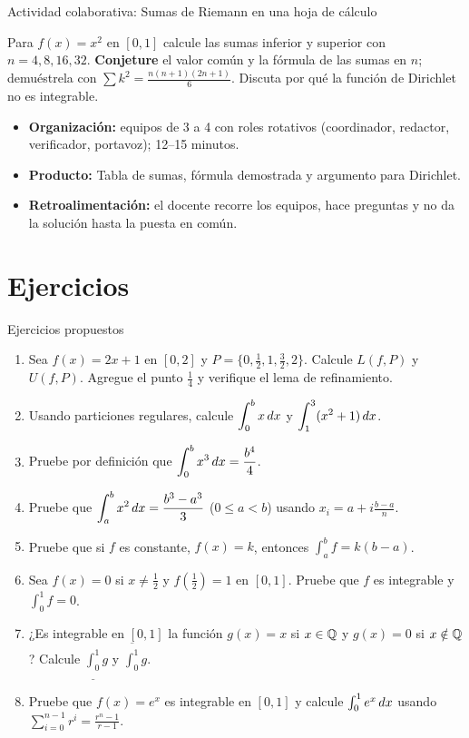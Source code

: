 \documentclass[10pt,aspectratio=169]{beamer}
\begin{document}
\begin{frame}{Actividad colaborativa: Sumas de Riemann en una hoja de cálculo}
  \small
  \begin{activa}
    Para $f(x)=x^2$ en $[0,1]$ calcule las sumas inferior y superior con $n=4,8,16,32$. \textbf{Conjeture} el valor común y la fórmula de las sumas en $n$; demuéstrela con $\sum k^2=\frac{n(n+1)(2n+1)}6$. Discuta por qué la función de Dirichlet no es integrable.
  \end{activa}
  \begin{itemize}
    \item \textbf{Organización:} equipos de 3 a 4 con roles rotativos (coordinador, redactor, verificador, portavoz); 12--15 minutos.
    \item \textbf{Producto:} Tabla de sumas, fórmula demostrada y argumento para Dirichlet.
    \item \textbf{Retroalimentación:} el docente recorre los equipos, hace preguntas y no da la solución hasta la puesta en común.
  \end{itemize}
\end{frame}

\section{Ejercicios}

\begin{frame}{Ejercicios propuestos}
  \begin{ejercicio}
    \begin{enumerate}
      \item Sea $f(x)=2x+1$ en $[0,2]$ y $P=\{0,\tfrac12,1,\tfrac32,2\}$. Calcule $L(f,P)$ y $U(f,P)$.
        Agregue el punto $\tfrac14$ y verifique el lema de refinamiento.
      \item Usando particiones regulares, calcule $\displaystyle\int_0^b x\,dx$ y $\displaystyle\int_1^3(x^2+1)\,dx$.
      \item Pruebe por definición que $\displaystyle\int_0^b x^3\,dx=\frac{b^4}{4}$.
      \item Pruebe que $\displaystyle\int_a^b x^2\,dx=\frac{b^3-a^3}{3}$ ($0\le a<b$) usando $x_i=a+i\frac{b-a}{n}$.
      \item Pruebe que si $f$ es constante, $f(x)=k$, entonces $\int_a^b f=k(b-a)$.
      \item Sea $f(x)=0$ si $x\neq\tfrac12$ y $f(\tfrac12)=1$ en $[0,1]$. Pruebe que $f$ es integrable y $\int_0^1f=0$.
      \item ¿Es integrable en $[0,1]$ la función $g(x)=x$ si $x\in\mathbb{Q}$ y $g(x)=0$ si $x\notin\mathbb{Q}$? Calcule
        $\underline{\int_0^1}g$ y $\overline{\int_0^1}g$.
      \item Pruebe que $f(x)=e^x$ es integrable en $[0,1]$ y calcule $\int_0^1e^x\,dx$ usando
        $\sum_{i=0}^{n-1}r^i=\frac{r^n-1}{r-1}$.
    \end{enumerate}
  \end{ejercicio}
\end{frame}
\end{document}
